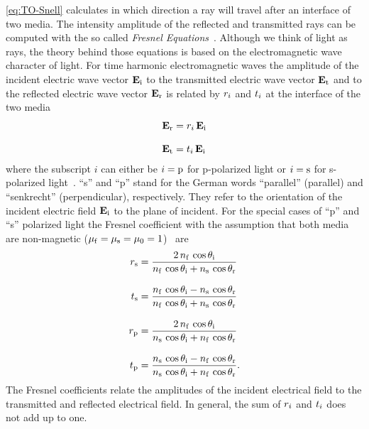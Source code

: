 
\cref{eq:TO-Snell} calculates in which direction a ray will travel after an 
interface of two media. The intensity amplitude of the reflected and 
transmitted rays can be computed with the so called \emph{Fresnel 
Equations}~\cite{Jackson2013,Born1980Ch1}. Although we think of light as rays, 
the theory behind those equations is based on the electromagnetic wave 
character of light. For time harmonic electromagnetic waves the amplitude of 
the incident electric wave vector $\vb{E}_{\mathrm{i}}$ to the transmitted electric 
wave vector $\vb{E}_{\mathrm{t}}$ and to the reflected electric wave vector 
$\vb{E}_{\mathrm{r}}$ is related by $r_{i}$ and $t_{i}$ at the 
interface of the two media
\begin{subequations}
\begin{align}
  \vb{E}_{\mathrm{r}} & =r_{i}\,\vb{E}_{\mathrm{i}} \\[3mm]
  \vb{E}_{\mathrm{t}} & =t_{i}\,\vb{E}_{\mathrm{i}}
\end{align}
\end{subequations}
where the subscript $i$ can either be $i=\mathrm{p}$ for p-polarized light or 
$i=\mathrm{s}$ for s-polarized light~\cite{Jackson2013,Born1980Ch1}. ``s'' and 
``p'' stand for the German words ``parallel'' (parallel) and ``senkrecht'' 
(perpendicular), respectively. They refer to the orientation of the incident 
electric field $\vb{E}_{\mathrm{i}}$ to the plane of incident. For the special 
cases of ``p'' and ``s'' polarized light the Fresnel coefficient with the 
assumption that both media are non-magnetic ($\mu_{\mathrm{f}} = \mu_{\mathrm{s}} = 
\mu_{0} = 1$)~\cite{Born1980Ch1} are
\begin{subequations}
\begin{align}
  r_{\mathrm{s}} & =
  \frac{2\,n_{\mathrm{f}}\,\cos\theta_{\mathrm{i}}}{n_{\mathrm{f}}\,\cos\theta_{\mathrm{i}} + n_{\mathrm{s}}\,\cos\theta_{\mathrm{r}}} 
  \label{eq:TO-fresnel-rs}\\[3mm]
  t_{\mathrm{s}} & = \frac{n_{\mathrm{f}}\,\cos\theta_{\mathrm{i}} - 
  n_{\mathrm{s}}\,\cos\theta_{\mathrm{r}}}{n_{\mathrm{f}}\,\cos\theta_{\mathrm{i}} + n_{\mathrm{s}}\,\cos\theta_{\mathrm{r}}} 
  \label{eq:TO-fresnel-ts}\\[3mm]
  r_{\mathrm{p}} & =
  \frac{2\,n_{\mathrm{f}}\,\cos\theta_{\mathrm{i}}}{n_{\mathrm{s}}\,\cos\theta_{\mathrm{i}} + n_{\mathrm{f}}\,\cos\theta_{\mathrm{r}}} 
  \label{eq:TO-fresnel-rp}\\[3mm]
  t_{\mathrm{p}} & = \frac{n_{\mathrm{s}}\,\cos\theta_{\mathrm{i}} - 
  n_{\mathrm{f}}\,\cos\theta_{\mathrm{r}}}{n_{\mathrm{s}}\,\cos\theta_{\mathrm{i}} + n_{\mathrm{f}}\,\cos\theta_{\mathrm{r}}}.
\label{eq:TO-fresnel-tp}
\end{align}
\end{subequations}
The Fresnel coefficients relate the amplitudes of the incident electrical field 
to the transmitted and reflected electrical field. In general, the sum of 
$r_{i}$ and $t_{i}$ does not add up to one.


